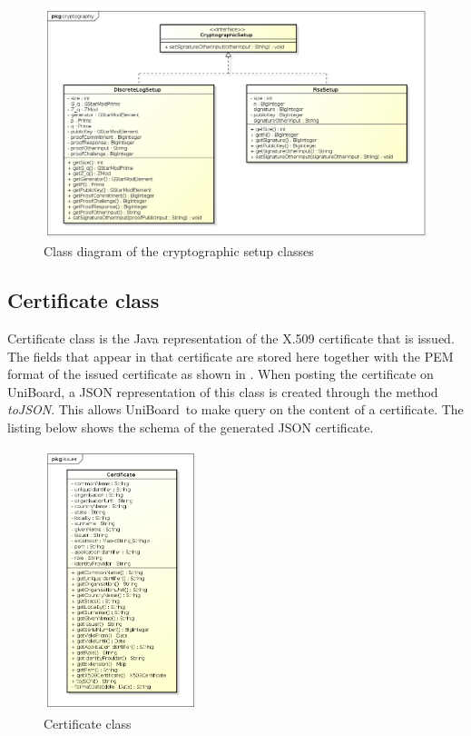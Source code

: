 \documentclass[oneside]{scrreprt}
\newcommand{\uniboard}{\mbox{UniBoard}}
\begin{document}
\begin{figure}[ht]
\centerline{
\includegraphics[width=\textwidth]{figs/cryptographic_setup_class_diagram.png}}
\caption{Class diagram of the cryptographic setup classes}
\label{fig:cryptographic_setup_class_diagram}
\end{figure}

\subsection{Certificate class}

Certificate class is the Java representation of the X.509 certificate that is issued. The fields that appear in that certificate are stored here together with the PEM format of the issued certificate as shown in . When posting the certificate on \uniboard, a JSON representation of this class is created through the method \textit{toJSON}. This allows \uniboard\ to make query on the content of a certificate. The listing below shows the schema of the generated JSON certificate.

\begin{figure}[ht]
\centerline{
\includegraphics[width=0.4\textwidth]{figs/certificate_class.png}}
\caption{Certificate class}
\label{fig:certificate}
\end{figure}
\end{document}
